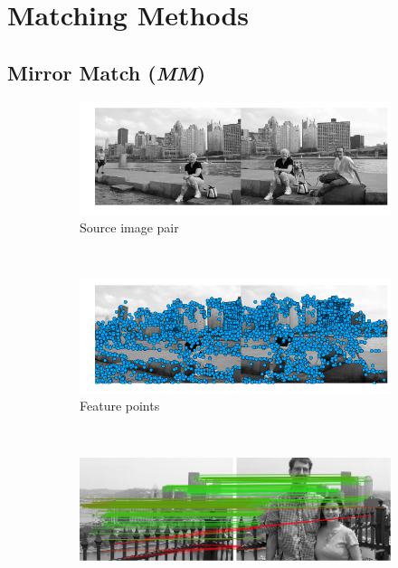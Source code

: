 \documentclass[conference]{IEEEtran}
\begin{document}
\section{Matching Methods}
\label{S:MatchingMethods}

\subsection{Mirror Match (\emph{MM})}

\begin{figure}
	\centering%
		\begin{subfigure}[t]{\columnwidth}
			\centering
			\includegraphics[width=0.85\columnwidth]{images/MMC_pitts_source}
			\caption{Source image pair}
			\label{fig:pitts_source}
		\end{subfigure}%
		\\ %
		\begin{subfigure}[t]{\columnwidth}
			\centering
			\includegraphics[width=0.85\columnwidth]{images/MMC_pitts_keypoints}
			\caption{Feature points}
			\label{fig:pitts_keypoints}
		\end{subfigure}%
		\\ %
		\begin{subfigure}[t]{\columnwidth}
			\centering
			\includegraphics[width=0.85\columnwidth]{images/mirror_match_off}

\end{subfigure}
\end{figure}
\end{document}
